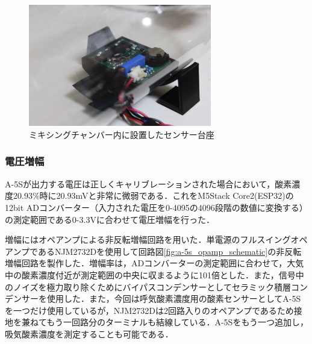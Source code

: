 \begin{figure}[H]
  \begin{center}
    \includegraphics[width=8cm]{fig/sensor_board}
    \caption{ミキシングチャンバー内に設置したセンサー台座}
    \label{fig:sensor_board}
  \end{center}
\end{figure}

\subsubsection{電圧増幅}
\label{sec:opamp}

A-5Sが出力する電圧は正しくキャリブレーションされた場合において，酸素濃度20.93\%時に20.93mVと非常に微弱である．これをM5Stack Core2(ESP32)の12bit ADコンバーター（入力された電圧を0-4095の4096段階の数値に変換する）の測定範囲である0-3.3Vに合わせて電圧増幅を行った．

増幅にはオペアンプによる非反転増幅回路を用いた．単電源のフルスイングオペアンプであるNJM2732Dを使用して回路図\ref{fig:a-5s_opamp_schematic}の非反転増幅回路を製作した．増幅率は，ADコンバーターの測定範囲に合わせて，大気中の酸素濃度付近が測定範囲の中央に収まるように101倍とした．また，信号中のノイズを極力取り除くためにバイパスコンデンサーとしてセラミック積層コンデンサーを使用した．また，今回は呼気酸素濃度用の酸素センサーとしてA-5Sを一つだけ使用しているが，NJM2732Dは2回路入りのオペアンプであるため接地を兼ねてもう一回路分のターミナルも結線している．A-5Sをもう一つ追加し，吸気酸素濃度を測定することも可能である．


